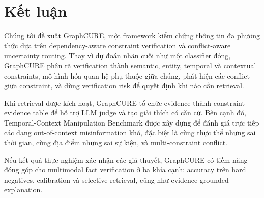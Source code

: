 \documentclass[11pt,a4paper]{article}
\begin{document}
\section{Kết luận}

Chúng tôi đề xuất GraphCURE, một framework kiểm chứng thông tin đa phương thức dựa trên dependency-aware constraint verification và conflict-aware uncertainty routing. Thay vì dự đoán nhãn cuối như một classifier đóng, GraphCURE phân rã verification thành semantic, entity, temporal và contextual constraints, mô hình hóa quan hệ phụ thuộc giữa chúng, phát hiện các conflict giữa constraint, và dùng verification risk để quyết định khi nào cần retrieval.

Khi retrieval được kích hoạt, GraphCURE tổ chức evidence thành constraint evidence table để hỗ trợ LLM judge và tạo giải thích có căn cứ. Bên cạnh đó, Temporal-Context Manipulation Benchmark được xây dựng để đánh giá trực tiếp các dạng out-of-context misinformation khó, đặc biệt là cùng thực thể nhưng sai thời gian, cùng địa điểm nhưng sai sự kiện, và multi-constraint conflict.

Nếu kết quả thực nghiệm xác nhận các giả thuyết, GraphCURE có tiềm năng đóng góp cho multimodal fact verification ở ba khía cạnh: accuracy trên hard negatives, calibration và selective retrieval, cũng như evidence-grounded explanation.


\end{document}

